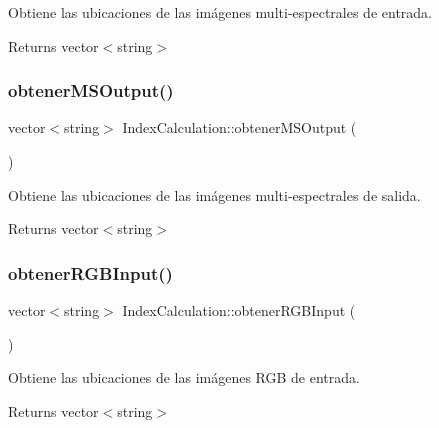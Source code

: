 Obtiene las ubicaciones de las imágenes multi-\/espectrales de entrada. 

\begin{DoxyReturn}{Returns}
vector$<$string$>$ 
\end{DoxyReturn}
\mbox{\label{classIndexCalculation_a43b986cd58175d47714a399e7fdfd7e3}} 
\subsubsection{\texorpdfstring{obtener\+M\+S\+Output()}{obtenerMSOutput()}}
{\footnotesize\ttfamily vector$<$string$>$ Index\+Calculation\+::obtener\+M\+S\+Output (\begin{DoxyParamCaption}{ }\end{DoxyParamCaption})\hspace{0.3cm}{\ttfamily [inline]}}



Obtiene las ubicaciones de las imágenes multi-\/espectrales de salida. 

\begin{DoxyReturn}{Returns}
vector$<$string$>$ 
\end{DoxyReturn}
\mbox{\label{classIndexCalculation_aacf5294ab87007a511f9f9e9772855af}} 
\subsubsection{\texorpdfstring{obtener\+R\+G\+B\+Input()}{obtenerRGBInput()}}
{\footnotesize\ttfamily vector$<$string$>$ Index\+Calculation\+::obtener\+R\+G\+B\+Input (\begin{DoxyParamCaption}{ }\end{DoxyParamCaption})\hspace{0.3cm}{\ttfamily [inline]}}



Obtiene las ubicaciones de las imágenes R\+GB de entrada. 

\begin{DoxyReturn}{Returns}
vector$<$string$>$ 
\end{DoxyReturn}
\mbox{\label{classIndexCalculation_a23a9f9a23db086109989fb93450a70d7}} 
